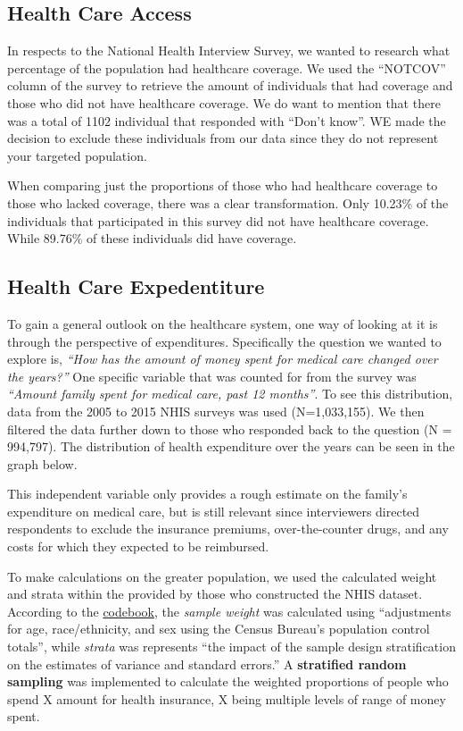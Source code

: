 \documentclass[10pt,]{article}
\begin{document}
\subsection{\texorpdfstring{\textbf{Health Care
Access}}{Health Care Access}}\label{health-care-access}

In respects to the National Health Interview Survey, we wanted to
research what percentage of the population had healthcare coverage. We
used the ``NOTCOV'' column of the survey to retrieve the amount of
individuals that had coverage and those who did not have healthcare
coverage. We do want to mention that there was a total of 1102
individual that responded with ``Don't know''. WE made the decision to
exclude these individuals from our data since they do not represent your
targeted population.

When comparing just the proportions of those who had healthcare coverage
to those who lacked coverage, there was a clear transformation. Only
10.23\% of the individuals that participated in this survey did not have
healthcare coverage. While 89.76\% of these individuals did have
coverage.

\subsection{\texorpdfstring{\textbf{Health Care
Expedentiture}}{Health Care Expedentiture}}\label{health-care-expedentiture}

To gain a general outlook on the healthcare system, one way of looking
at it is through the perspective of expenditures. Specifically the
question we wanted to explore is, \emph{``How has the amount of money
spent for medical care changed over the years?''} One specific variable
that was counted for from the survey was \emph{``Amount family spent for
medical care, past 12 months''}. To see this distribution, data from the
2005 to 2015 NHIS surveys was used (N=1,033,155). We then filtered the
data further down to those who responded back to the question (N =
994,797). The distribution of health expenditure over the years can be
seen in the graph below.

This independent variable only provides a rough estimate on the family's
expenditure on medical care, but is still relevant since interviewers
directed respondents to exclude the insurance premiums, over-the-counter
drugs, and any costs for which they expected to be reimbursed.

To make calculations on the greater population, we used the calculated
weight and strata within the provided by those who constructed the NHIS
dataset. According to the \href{https://ihis.ipums.org/}{codebook}, the
\emph{sample weight} was calculated using ``adjustments for age,
race/ethnicity, and sex using the Census Bureau's population control
totals'', while \emph{strata} was represents ``the impact of the sample
design stratification on the estimates of variance and standard
errors.'' A \textbf{stratified random sampling} was implemented to
calculate the weighted proportions of people who spend X amount for
health insurance, X being multiple levels of range of money spent.
\end{document}
